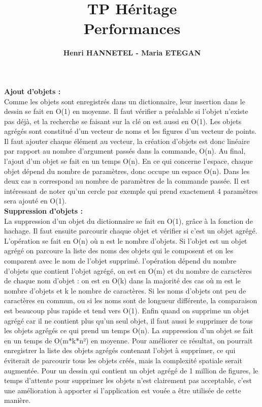 \documentclass[legalpaper]{article}
\title{TP Héritage\\ Performances}
\author{\textbf{Henri HANNETEL - Maria ETEGAN}}
\date{}
\begin{document}
\maketitle

\textbf{Ajout d'objets :} \\
\hspace*{\parindent}Comme les objets sont enregistrés dans un dictionnaire, leur insertion dans le dessin se fait en O(1) en moyenne. Il faut vérifier a préalable si l'objet n'existe pas déjà, et la recherche se faisant sur la clé on est aussi en O(1). Les objets agrégés sont constitué d'un vecteur de noms et les figures d'un vecteur de points. Il faut ajouter chaque élément au vecteur, la création d'objets est donc linéaire par rapport au nombre d'argument passés dans la commande, O(n). Au final, l'ajout d'un objet se fait en un temps O(n). En ce qui concerne l'espace, chaque objet dépend du nombre de paramètres, donc occupe un espace O(n). Dans les deux cas n correspond au nombre de paramètres de la commande passée. Il est intéressant de noter qu'un cercle par exemple qui prend exactement 4 paramètres sera ajouté en O(1).\\

\textbf{Suppression d'objets :}\\
\hspace*{\parindent}La suppression d'un objet du dictionnaire se fait en O(1), grâce à la fonction de hachage. Il faut ensuite parcourir chaque objet et vérifier si c'est un objet agrégé. L'opération se fait en O(n) où n est le nombre d'objets. Si l'objet est un objet agrégé on parcoure la liste des noms des objets qui le composent et on les comparent avec le nom de l'objet supprimé. l'opération dépend du nombre d'objets que contient l'objet agrégé, on est en O(m) et du nombre de caractères de chaque nom d'objet : on est en O(k) dans la majorité des cas où m est le nombre d'objets et k le nombre de caractères. Si les noms d'objets ont peu de caractères en commun, ou si les noms sont de longueur différente, la comparaison est beaucoup plus rapide et tend vers O(1). Enfin quand on supprime un objet agrégé car il ne contient plus qu'un seul objet, il faut aussi le supprimer de tous les objets agrégés ce qui prend un temps O(n). La suppression d'un objet se fait en un temps de O(m*k*n²) en moyenne. Pour améliorer ce résultat, on pourrait enregistrer la liste des objets agrégés contenant l'objet à supprimer, ce qui éviterait de parcourir tous les objets créés, mais la complexité spatiale serait augmentée. Pour un dessin qui contient un objet agrégé de 1 million de figures, le temps d'attente pour supprimer les objets n'est clairement pas acceptable, c'est une amélioration à apporter si l'application est vouée a être utilisée de cette manière.\\
\end{document}
